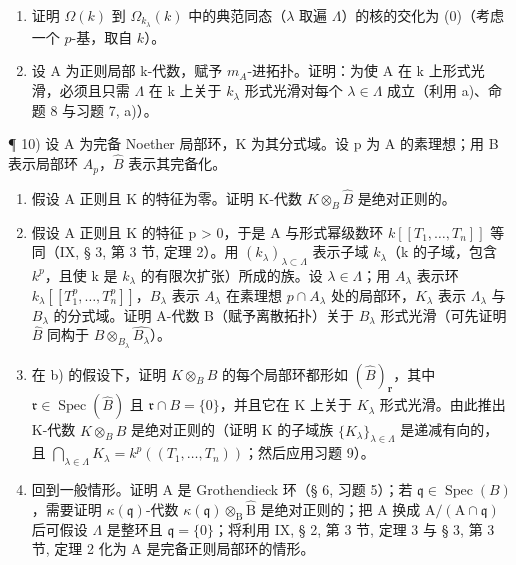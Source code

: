 \begin{enumerate}
\def\labelenumi{\alph{enumi})}
\item
  证明 \(\Omega(k)\) 到 \(\Omega_{k_{\lambda}}(k)\) 中的典范同态（\(\lambda\) 取遍 \(\Lambda\)）的核的交化为 (0)（考虑一个 \(p\)-基，取自 \(k\)）。
\item
  设 A 为正则局部 k-代数，赋予 \(m_{A}\)-进拓扑。证明：为使 A 在 k 上形式光滑，必须且只需 \(\Lambda\) 在 k 上关于 \(k_{\lambda}\) 形式光滑对每个 \(\lambda \in \Lambda\) 成立（利用 a)、命题 8 与习题 7, a)）。
\end{enumerate}

¶ 10) 设 A 为完备 Noether 局部环，K 为其分式域。设 p 为 A 的素理想；用 B 表示局部环 \(A_{p}\)，\(\widehat{B}\) 表示其完备化。

\begin{enumerate}
\def\labelenumi{\alph{enumi})}
\item
  假设 A 正则且 K 的特征为零。证明 K-代数 \(K \otimes_{B} \widehat{B}\) 是绝对正则的。
\item
  假设 A 正则且 K 的特征 p \textgreater{} 0，于是 A 与形式幂级数环 \(k[[T_{1}, \ldots, T_{n}]]\) 等同（IX, § 3, 第 3 节, 定理 2）。用 \((k_{\lambda})_{\lambda \subset \Lambda}\) 表示子域 \(k_{\lambda}\)（k 的子域，包含 \(k^{p}\)，且使 k 是 \(k_{\lambda}\) 的有限次扩张）所成的族。设 \(\lambda \in \Lambda\)；用 \(A_{\lambda}\) 表示环 \(k_{\lambda}[[T_{1}^{p}, \ldots, T_{n}^{p}]]\)，\(B_{\lambda}\) 表示 \(A_{\lambda}\) 在素理想 \(p \cap A_{\lambda}\) 处的局部环，\(K_{\lambda}\) 表示 \(\Lambda_{\lambda}\) 与 \(B_{\lambda}\) 的分式域。证明 A-代数 B（赋予离散拓扑）关于 \(B_{\lambda}\) 形式光滑（可先证明 \(\widehat{B}\) 同构于 \(B \otimes_{B_{\lambda}} \widehat{B_{\lambda}}\)）。
\item
  在 b) 的假设下，证明 \(K \otimes_{B} \widehat{B}\) 的每个局部环都形如 \((\widehat{B})_{\mathbf{r}}\)，其中 \(\mathfrak{r} \in \operatorname{Spec}(\widehat{B})\) 且 \(\mathfrak{r} \cap B = \{0\}\)，并且它在 K 上关于 \(K_{\lambda}\) 形式光滑。由此推出 K-代数 \(K \otimes_{B} \widehat{B}\) 是绝对正则的（证明 K 的子域族 \(\{K_{\lambda}\}_{\lambda \in \Lambda}\) 是递减有向的，且 \(\bigcap_{\lambda \in \Lambda} K_{\lambda} = k^{p}((T_{1}, \ldots, T_{n}))\)；然后应用习题 9）。
\item
  回到一般情形。证明 A 是 Grothendieck 环（§ 6, 习题 5）；若 \(\mathfrak{q} \in \operatorname{Spec}(B)\)，需要证明 \(\kappa(\mathfrak{q})\)-代数 \(\kappa(\mathfrak{q}) \otimes_{\mathrm{B}} \widehat{\mathrm{B}}\) 是绝对正则的；把 A 换成 \(\mathrm{A}/(\mathrm{A} \cap \mathfrak{q})\) 后可假设 \(\Lambda\) 是整环且 \(\mathfrak{q} = \{0\}\)；将利用 IX, § 2, 第 3 节, 定理 3 与 § 3, 第 3 节, 定理 2 化为 A 是完备正则局部环的情形。
\end{enumerate}

